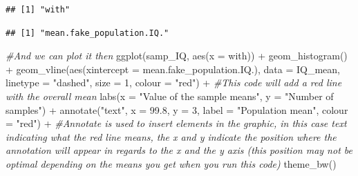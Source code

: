 \documentclass[
]{book}
\newenvironment{Shaded}{\begin{snugshade}}{\end{snugshade}}
\newcommand{\AttributeTok}[1]{\textcolor[rgb]{0.77,0.63,0.00}{#1}}
\newcommand{\CommentTok}[1]{\textcolor[rgb]{0.56,0.35,0.01}{\textit{#1}}}
\newcommand{\DecValTok}[1]{\textcolor[rgb]{0.00,0.00,0.81}{#1}}
\newcommand{\FloatTok}[1]{\textcolor[rgb]{0.00,0.00,0.81}{#1}}
\newcommand{\FunctionTok}[1]{\textcolor[rgb]{0.00,0.00,0.00}{#1}}
\newcommand{\NormalTok}[1]{#1}
\newcommand{\OtherTok}[1]{\textcolor[rgb]{0.56,0.35,0.01}{#1}}
\newcommand{\SpecialCharTok}[1]{\textcolor[rgb]{0.00,0.00,0.00}{#1}}
\newcommand{\StringTok}[1]{\textcolor[rgb]{0.31,0.60,0.02}{#1}}
\begin{document}
\begin{verbatim}
## [1] "with"
\end{verbatim}

\begin{Shaded}
\end{Shaded}

\begin{verbatim}
## [1] "mean.fake_population.IQ."
\end{verbatim}

\begin{Shaded}
\begin{Highlighting}[]
\CommentTok{\#And we can plot it then}
\FunctionTok{ggplot}\NormalTok{(samp\_IQ, }\FunctionTok{aes}\NormalTok{(}\AttributeTok{x =}\NormalTok{ with)) }\SpecialCharTok{+} 
  \FunctionTok{geom\_histogram}\NormalTok{() }\SpecialCharTok{+}
  \FunctionTok{geom\_vline}\NormalTok{(}\FunctionTok{aes}\NormalTok{(}\AttributeTok{xintercept =}\NormalTok{ mean.fake\_population.IQ.), }\AttributeTok{data =}\NormalTok{ IQ\_mean,}
             \AttributeTok{linetype =} \StringTok{"dashed"}\NormalTok{, }\AttributeTok{size =} \DecValTok{1}\NormalTok{, }\AttributeTok{colour =} \StringTok{"red"}\NormalTok{) }\SpecialCharTok{+} \CommentTok{\#This code will add a red line with the overall mean}
  \FunctionTok{labs}\NormalTok{(}\AttributeTok{x =} \StringTok{"Value of the sample means"}\NormalTok{, }\AttributeTok{y =} \StringTok{"Number of samples"}\NormalTok{) }\SpecialCharTok{+}
  \FunctionTok{annotate}\NormalTok{(}\StringTok{"text"}\NormalTok{, }\AttributeTok{x =} \FloatTok{99.8}\NormalTok{, }\AttributeTok{y =} \DecValTok{3}\NormalTok{, }\AttributeTok{label =} \StringTok{"Population mean"}\NormalTok{, }\AttributeTok{colour =} \StringTok{"red"}\NormalTok{) }\SpecialCharTok{+} \CommentTok{\#Annotate is used to insert elements in the graphic, in this case text indicating what the red line means, the x and y indicate the position where the annotation will appear in regards to the x and the y axis (this position may not be optimal depending on the means you get when you run this code)}
  \FunctionTok{theme\_bw}\NormalTok{()}
\end{Highlighting}
\end{Shaded}
\end{document}
